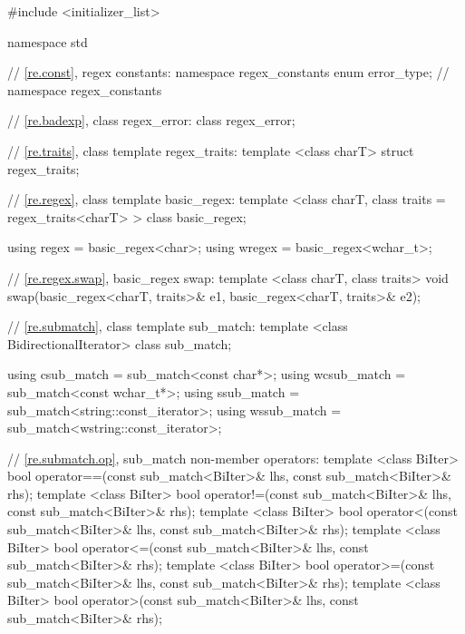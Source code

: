 %
%
%
%
\begin{codeblock}
#include <initializer_list>

namespace std {

  // \ref{re.const}, regex constants:
  namespace regex_constants {
    enum error_type;
  } // namespace regex_constants

  // \ref{re.badexp}, class regex_error:
  class regex_error;

  // \ref{re.traits}, class template regex_traits:
  template <class charT> struct regex_traits;

  // \ref{re.regex}, class template basic_regex:
  template <class charT, class traits = regex_traits<charT> > class basic_regex;

  using regex  = basic_regex<char>;
  using wregex = basic_regex<wchar_t>;

  // \ref{re.regex.swap}, basic_regex swap:
  template <class charT, class traits>
    void swap(basic_regex<charT, traits>& e1, basic_regex<charT, traits>& e2);

  // \ref{re.submatch}, class template sub_match:
  template <class BidirectionalIterator> 
    class sub_match;

  using csub_match  = sub_match<const char*>;
  using wcsub_match = sub_match<const wchar_t*>;
  using ssub_match  = sub_match<string::const_iterator>;
  using wssub_match = sub_match<wstring::const_iterator>;

  // \ref{re.submatch.op}, sub_match non-member operators:
  template <class BiIter>
    bool operator==(const sub_match<BiIter>& lhs, const sub_match<BiIter>& rhs);
  template <class BiIter>
    bool operator!=(const sub_match<BiIter>& lhs, const sub_match<BiIter>& rhs);
  template <class BiIter>
    bool operator<(const sub_match<BiIter>& lhs, const sub_match<BiIter>& rhs);
  template <class BiIter>
    bool operator<=(const sub_match<BiIter>& lhs, const sub_match<BiIter>& rhs);
  template <class BiIter>
    bool operator>=(const sub_match<BiIter>& lhs, const sub_match<BiIter>& rhs);
  template <class BiIter>
    bool operator>(const sub_match<BiIter>& lhs, const sub_match<BiIter>& rhs);


}
\end{codeblock}
